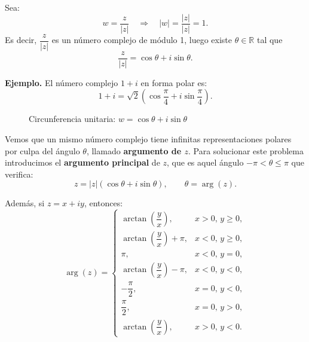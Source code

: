 \documentclass[a4paper,12pt]{article}
\begin{document}
Sea:
\[
w = \frac{z}{|z|} \quad \Rightarrow \quad |w| = \frac{|z|}{|z|} = 1.
\]
Es decir, $\dfrac{z}{|z|}$ es un número complejo de módulo 1, luego existe $\theta \in \mathbb{R}$ tal que
\[
\frac{z}{|z|} = \cos\theta + i\sin\theta.
\]

\noindent\textbf{Ejemplo.} El número complejo $1+i$ en forma polar es:
\[
1+i = \sqrt{2}\left(\cos\frac{\pi}{4} + i\sin\frac{\pi}{4}\right).
\]

\begin{figure}[h]
\centering
{}

\medskip
{\small Circunferencia unitaria: \(w=\cos\theta+i\sin\theta\)}
\end{figure}

Vemos que un mismo número complejo tiene infinitas representaciones polares por culpa del ángulo $\theta$, llamado \textbf{argumento de $z$}.  
Para solucionar este problema introducimos el \textbf{argumento principal} de $z$, que es aquel ángulo $-\pi < \theta \leq \pi$ que verifica:
\[
z = |z|(\cos\theta + i\sin\theta), \qquad \theta = \arg(z).
\]

Además, si $z = x+iy$, entonces:
\[
\arg(z) =
\begin{cases}
\arctan\!\left(\dfrac{y}{x}\right), & x > 0, \, y \geq 0, \\[1ex]
\arctan\!\left(\dfrac{y}{x}\right)+\pi, & x < 0, \, y \geq 0, \\[1ex]
\pi, & x < 0, \, y = 0, \\[1ex]
\arctan\!\left(\dfrac{y}{x}\right)-\pi, & x < 0, \, y < 0, \\[1ex]
-\dfrac{\pi}{2}, & x = 0, \, y < 0, \\[1ex]
\dfrac{\pi}{2}, & x = 0, \, y > 0, \\[1ex]
\arctan\!\left(\dfrac{y}{x}\right), & x > 0, \, y < 0.
\end{cases}
\]
\end{document}
